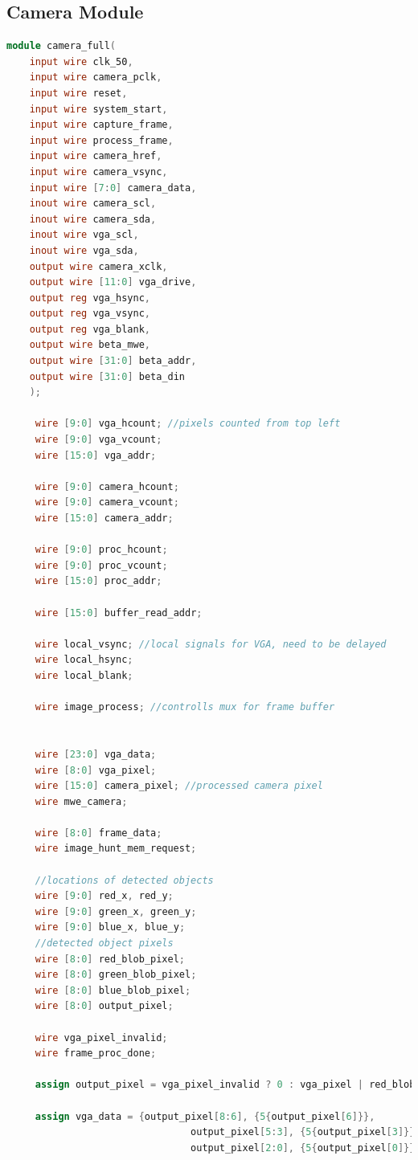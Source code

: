 \documentclass{article}
\begin{document}
\subsection{Camera Module}
\begin{lstlisting}[language=Verilog]
module camera_full(
	input wire clk_50,
	input wire camera_pclk,
	input wire reset,
	input wire system_start,
	input wire capture_frame,
	input wire process_frame,
	input wire camera_href,
	input wire camera_vsync,
	input wire [7:0] camera_data,
	inout wire camera_scl,
	inout wire camera_sda,
	inout wire vga_scl,
	inout wire vga_sda,
	output wire camera_xclk,
	output wire [11:0] vga_drive,
	output reg vga_hsync,
	output reg vga_vsync,
	output reg vga_blank,
	output wire beta_mwe,
	output wire [31:0] beta_addr,
	output wire [31:0] beta_din	
    );
	 
	 wire [9:0] vga_hcount; //pixels counted from top left
	 wire [9:0] vga_vcount; 
	 wire [15:0] vga_addr;
	 
	 wire [9:0] camera_hcount;
	 wire [9:0] camera_vcount;
	 wire [15:0] camera_addr;
	 
	 wire [9:0] proc_hcount;
	 wire [9:0] proc_vcount;
	 wire [15:0] proc_addr;
	 
	 wire [15:0] buffer_read_addr;
	 
	 wire local_vsync; //local signals for VGA, need to be delayed
	 wire local_hsync; 
	 wire local_blank; 	
	 
	 wire image_process; //controlls mux for frame buffer
	 
	  
	 wire [23:0] vga_data;
	 wire [8:0] vga_pixel;
	 wire [15:0] camera_pixel; //processed camera pixel
	 wire mwe_camera;
	 
	 wire [8:0] frame_data; 
	 wire image_hunt_mem_request; 
	 
	 //locations of detected objects
	 wire [9:0] red_x, red_y;
	 wire [9:0] green_x, green_y;
	 wire [9:0] blue_x, blue_y;
	 //detected object pixels
	 wire [8:0] red_blob_pixel;
	 wire [8:0] green_blob_pixel;
	 wire [8:0] blue_blob_pixel; 
	 wire [8:0] output_pixel;
	 
	 wire vga_pixel_invalid; 
	 wire frame_proc_done;
	
	 assign output_pixel = vga_pixel_invalid ? 0 : vga_pixel | red_blob_pixel | green_blob_pixel | blue_blob_pixel;
	 
	 assign vga_data = {output_pixel[8:6], {5{output_pixel[6]}},
								output_pixel[5:3], {5{output_pixel[3]}},
								output_pixel[2:0], {5{output_pixel[0]}}};
								

\end{lstlisting}
\end{document}

